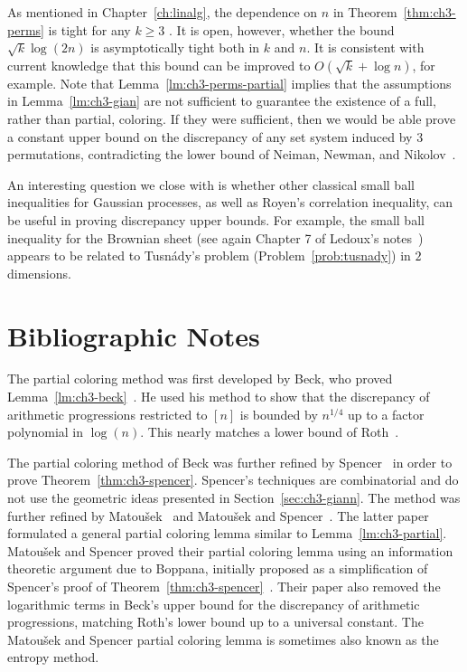 As mentioned in Chapter~\ref{ch:linalg}, 
the dependence on $n$ in Theorem~\ref{thm:ch3-perms} is tight for any
$k \ge 3$ \cite{beck3perm}. It is open, however, whether the bound $\sqrt{k}\log(2n)$
is asymptotically tight both in $k$ and $n$. It is consistent with current knowledge that this bound can be improved to $O(\sqrt{k} + \log n)$, for example.
Note that
Lemma~\ref{lm:ch3-perms-partial} implies that the assumptions in
Lemma~\ref{lm:ch3-gian} are not sufficient to guarantee the existence
of a full, rather than partial, coloring. If they were sufficient,
then we would be able prove a constant upper bound on the discrepancy
of any set system induced by $3$ permutations, contradicting the lower
bound of Neiman, Newman, and Nikolov~\cite{beck3perm}.

An interesting question we close with is whether other classical small
ball inequalities for Gaussian processes, as well as Royen's
correlation inequality, can be useful in proving discrepancy upper
bounds.  For example, the small ball inequality for the Brownian sheet
(see again Chapter 7 of Ledoux's notes~\cite{Ledoux96}) appears to be
related to Tusn\'ady's problem (Problem~\ref{prob:tusnady}) in $2$
dimensions. 


\section{Bibliographic Notes}

The partial coloring method was first developed by Beck, who proved
Lemma~\ref{lm:ch3-beck}~\cite{beck-roth,Beck88}. He used his method to
show that the discrepancy of arithmetic progressions restricted to
$[n]$ is bounded by $n^{1/4}$ up to a factor polynomial in
$\log(n)$. This nearly matches a lower bound of Roth~\cite{roth-ap}. 

The partial coloring method of Beck was
further refined by Spencer~\cite{spencer1985} in order to prove
Theorem~\ref{thm:ch3-spencer}. Spencer's techniques are combinatorial
and do not use the geometric ideas presented in
Section~\ref{sec:ch3-giann}. The method was further refined by
Matou\v{s}ek~\cite{Matousek-halfspaces} and Matou\v{s}ek and
Spencer~\cite{MatousekSpencer-ap}. The latter paper formulated a
general partial coloring lemma similar to
Lemma~\ref{lm:ch3-partial}. Matou\v{s}ek and Spencer proved their
partial coloring lemma using an information theoretic argument due to
Boppana, initially proposed as a simplification of Spencer's proof of
Theorem~\ref{thm:ch3-spencer}~\cite{alon2000probabilistic}. Their
paper also removed the logarithmic terms in Beck's upper bound for the
discrepancy of arithmetic progressions, matching Roth's lower bound
up to a universal constant. The Matou\v{s}ek and Spencer
partial coloring lemma is sometimes also known as the entropy method.

